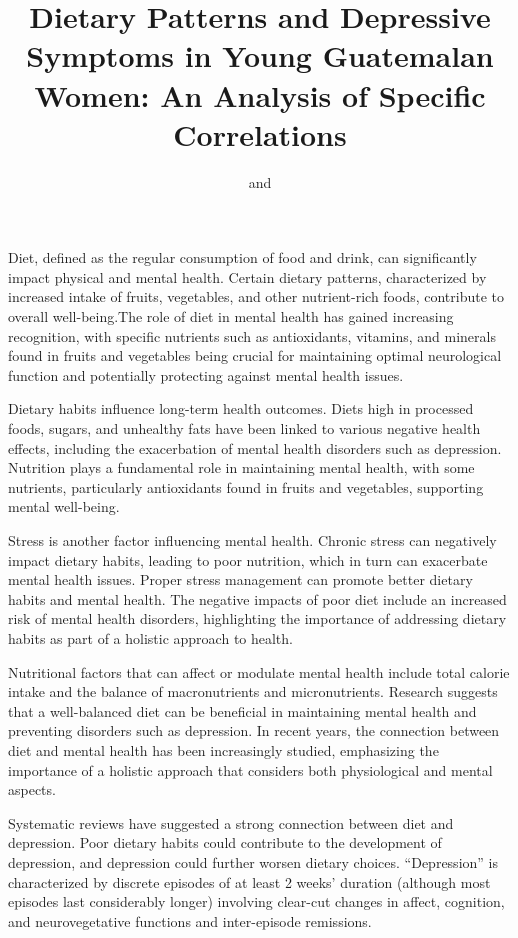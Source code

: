 \documentclass[jou]{apa7}
\title{Dietary Patterns and Depressive Symptoms in Young Guatemalan Women: An Analysis of Specific Correlations}
\author{
	\addORCIDlink{Camila Heredia, M.D.}{0009-0008-9550-9083} and \addORCIDlink{Lic. María Andrée Neumann}{0009-0001-2531-6058}
}
\begin{document}
	\maketitle

	Diet, defined as the regular consumption of food and drink, can significantly impact physical and mental health. Certain dietary patterns, characterized by increased intake of fruits, vegetables, and other nutrient-rich foods, contribute to overall well-being.The role of diet in mental health has gained increasing recognition, with specific nutrients such as antioxidants, vitamins, and minerals found in fruits and vegetables being crucial for maintaining optimal neurological function and potentially protecting against mental health issues.


	Dietary habits influence long-term health outcomes. Diets high in processed foods, sugars, and unhealthy fats have been linked to various negative health effects, including the exacerbation of mental health disorders such as depression. Nutrition plays a fundamental role in maintaining mental health, with some nutrients, particularly antioxidants found in fruits and vegetables, supporting mental well-being.


	Stress is another factor influencing mental health. Chronic stress can negatively impact dietary habits, leading to poor nutrition, which in turn can exacerbate mental health issues. Proper stress management can promote better dietary habits and mental health. The negative impacts of poor diet include an increased risk of mental health disorders, highlighting the importance of addressing dietary habits as part of a holistic approach to health.

	Nutritional factors that can affect or modulate mental health include total calorie intake and the balance of macronutrients and micronutrients. Research suggests that a well-balanced diet can be beneficial in maintaining mental health and preventing disorders such as depression. In recent years, the connection between diet and mental health has been increasingly studied, emphasizing the importance of a holistic approach that considers both physiological and mental aspects.

	Systematic reviews have suggested a strong connection between diet and depression. Poor dietary habits could contribute to the development of depression, and depression could further worsen dietary choices. ``Depression'' is characterized by discrete episodes of at least 2 weeks' duration (although most episodes last considerably longer) involving clear-cut changes in affect, cognition, and neurovegetative functions and inter-episode remissions\parencite{APA2014}.
\end{document}
